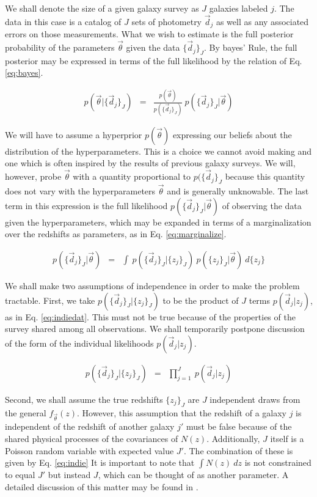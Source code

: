 \documentclass[preprint]{aastex}
\begin{document}
We shall denote the size of a given galaxy survey as $J$ galaxies labeled $j$.  
The data in this case is a catalog of $J$ sets of photometry $\vec{d}_{j}$ as 
well as any associated errors on those measurements.  What we wish to estimate 
is the full posterior probability of the parameters $\vec{\theta}$ given the 
data $\{\vec{d}_{j}\}_{J}$.  By bayes' Rule, the full posterior may be 
expressed in terms of the full likelihood by the relation of Eq. 
\ref{eq:bayes}.  

\begin{eqnarray}
\label{eq:bayes}
p(\vec{\theta}|\{\vec{d}_{j}\}_{J}) &=& 
\frac{p(\vec{\theta})}{p(\{\vec{d}_{j}\}_{J})}\ 
p(\{\vec{d}_{j}\}_{J}|\vec{\theta})
\end{eqnarray}

We will have to assume a hyperprior $p(\vec{\theta})$ expressing our beliefs 
about the distribution of the hyperparameters.  This is a choice we cannot 
avoid making and one which is often inspired by the results of previous galaxy 
surveys.  We will, however, probe $\vec{\theta}$ with a quantity proportional 
to $p(\{\vec{d}_{j}\}_{J}$ because this quantity does not vary with the 
hyperparameters $\vec{\theta}$ and is generally unknowable.  The last term in 
this expression is the full likelihood $p(\{\vec{d}_{j}\}_{J}|\vec{\theta})$ of 
observing the data given the hyperparameters, which may be expanded in terms of 
a marginalization over the redshifts as parameters, as in Eq. 
\ref{eq:marginalize}.  

\begin{eqnarray}
\label{eq:marginalize}
p(\{\vec{d}_{j}\}_{J}|\vec{\theta}) &=& \int\ 
p(\{\vec{d}_{j}\}_{J}|\{z_{j}\}_{J})\ p(\{z_{j}\}_{J}|\vec{\theta})\ d\{z_{j}\}
\end{eqnarray}

We shall make two assumptions of independence in order to make the problem 
tractable.  First, we take $p(\{\vec{d}_{j}\}_{J}|\{z_{j}\}_{J})$ to be the 
product of $J$ terms $p(\vec{d}_{j}|z_{j})$, as in Eq. \ref{eq:indiedat}.  This 
must not be true because of the properties of the survey shared among all 
observations.  We shall temporarily postpone discussion of the form of the 
individual likelihoods $p(\vec{d}_{j}|z_{j})$.  

\begin{eqnarray}
\label{eq:indiedat}
p(\{\vec{d}_{j}\}_{J}|\{z_{j}\}_{J}) &=& \prod_{j=1}^{J}\ p(\vec{d}_{j}|z_{j})
\end{eqnarray}

Second, we shall assume the true redshifts $\{z_{j}\}_{J}$ are $J$ independent 
draws from the general $f_{\vec{\theta}}(z)$.  However, this assumption that 
the redshift of a galaxy $j$ is independent of the redshift of another galaxy 
$j'$ must be false because of the shared physical processes of the covariances 
of $N(z)$.  Additionally, $J$ itself is a Poisson random variable with expected 
value $J'$.  The combination of these is given by Eq. \ref{eq:indie}  It is 
important to note that $\int N(z)\ dz$ is not constrained to equal $J'$ but 
instead $J$, which can be thought of as another parameter.  A detailed 
discussion of this matter may be found in \citet{for14}.
\end{document}

